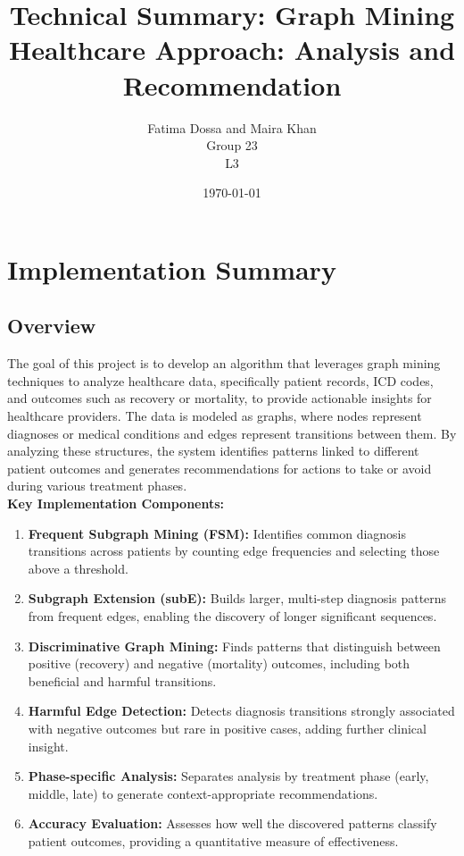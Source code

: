\documentclass[10pt]{article}
\title{Technical Summary: Graph Mining Healthcare Approach: Analysis and Recommendation}
\author{Fatima Dossa and Maira Khan \\ Group 23  \\ L3}
\date{\today}
\begin{document}
\maketitle

\section{Implementation Summary}
\subsection{Overview}

The goal of this project is to develop an algorithm that leverages graph mining techniques to analyze healthcare data, specifically patient records, ICD codes, and outcomes such as recovery or mortality, to provide actionable insights for healthcare providers. The data is modeled as graphs, where nodes represent diagnoses or medical conditions and edges represent transitions between them. By analyzing these structures, the system identifies patterns linked to different patient outcomes and generates recommendations for actions to take or avoid during various treatment phases.
\\
\textbf{Key Implementation Components:}
\begin{enumerate}[noitemsep]
    \item \textbf{Frequent Subgraph Mining (FSM):} Identifies common diagnosis transitions across patients by counting edge frequencies and selecting those above a threshold.
    \item \textbf{Subgraph Extension (subE):} Builds larger, multi-step diagnosis patterns from frequent edges, enabling the discovery of longer significant sequences.
    \item \textbf{Discriminative Graph Mining:} Finds patterns that distinguish between positive (recovery) and negative (mortality) outcomes, including both beneficial and harmful transitions.
    \item \textbf{Harmful Edge Detection:} Detects diagnosis transitions strongly associated with negative outcomes but rare in positive cases, adding further clinical insight.
    \item \textbf{Phase-specific Analysis:} Separates analysis by treatment phase (early, middle, late) to generate context-appropriate recommendations.
    \item \textbf{Accuracy Evaluation:} Assesses how well the discovered patterns classify patient outcomes, providing a quantitative measure of effectiveness.
\end{enumerate}
\end{document}

